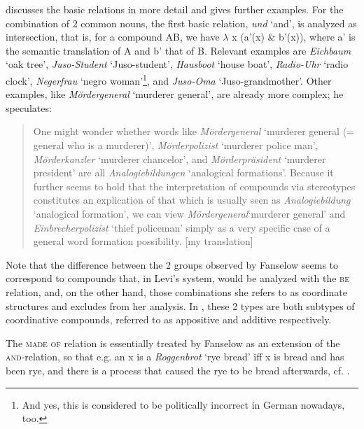 \citet[\S 17]{Fanselow:1981} discusses the basic relations in more detail and
gives further examples. For the combination of 2 common nouns, the
first basic relation, \emph{und} `and', is analyzed as intersection, that is,
for a compound AB, we have $\lambda$ x (a'(x) \&  b'(x)), where a' is the
semantic translation of A and b' that of B. Relevant examples are \emph{Eichbaum} `oak tree',
    \emph{Juso-Student} `Juso-student', \emph{Hausboot} `house boat',
    \emph{Radio-Uhr} `radio clock', \emph{Negerfrau}
    `negro woman'\footnote{And yes, this is considered to be politically
      incorrect in German nowadays, too.}, and \emph{Juso-Oma} `Juso-grandmother'. Other
  examples, like \emph{Mördergeneral} `murderer general', are already more complex;
he speculates:
\begin{quotation}
One might wonder whether words
  like \emph{Mördergeneral} `murderer general (= general who is a murderer)', \emph{Mörderpolizist}
  `murderer police man', \emph{Mörder\-kanzler} `murderer chancelor', and
    \emph{Mörderpräsident} `murderer president'
   are all \emph{Analogiebildungen} `analogical formations'. Because it
  further seems to hold that the interpretation of compounds via
  stereotypes constitutes an explication of that which is usually seen
  as \emph{Analogiebildung} `analogical formation', we can view
  \emph{Mördergeneral}`murderer general' and \emph{Einbrecherpolizist} `thief policeman' simply as a very
  specific case of a general word formation possibility. [my translation]
  \citep[176]{Fanselow:1981}  
\end{quotation}

Note that the difference between the 2
  groups observed by Fanselow seems to correspond to compounds that,
  in Levi's system, would be analyzed with the \textsc{be} relation, and, on
  the other hand, those combinations she refers to as coordinate
  structures and excludes from her analysis. In
  \citet[479--480]{Baueretal:2013}, these 2 types are both subtypes
  of coordinative compounds, referred to as
  appositive and additive respectively.

The \textsc{made of} relation is essentially treated by Fanselow as an extension of the
\textsc{and}-relation, so that e.g. an x is a \emph{Roggenbrot}
`rye bread' iff x is bread
and has been rye, and there is a process that caused the rye to be bread
afterwards, cf. \citet[180]{Fanselow:1981}.  


